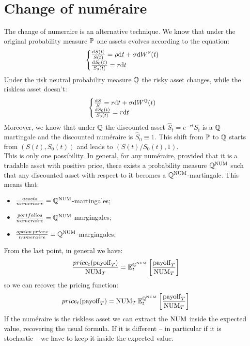 \section{Change of numéraire} %
The change of numeraire is an alternative technique. We know that under the original probability measure $\mathbb{P}$ one assets evolves according to the equation:
\begin{equation}
    \begin{cases}
    \frac{\dd S(t)}{S(t)} = \rho\dd t + \sigma\dd W^{\mathbb{P}}(t) \\
    \frac{\dd S_0(t)}{S_0(t)} = r\dd t
    \end{cases}
\end{equation}
Under the risk neutral probability measure $\mathbb{Q}$ the risky asset changes, while the riskless asset doesn't:
\begin{equation}
    \begin{cases}
    \frac{\dd S}{S} = r\dd t + \sigma\dd W^{\mathbb{Q}}(t) \\
    \frac{\dd S_0(t)}{S_0(t)} = r\dd t
    \end{cases} 
\end{equation}
Moreover, we know that under $\mathbb{Q}$ the discounted asset $\hat{S}_t = e^{-rt}S_t$ is a $\mathbb{Q}$-martingale and the discounted numéraire is $\hat{S}_0 \equiv 1$. This shift from $\mathbb{P}$ to $\mathbb{Q}$ starts from $(S(t),S_0(t))$ and leads to $(S(t)/S_0(t),1)$. \\
This is only one possibility. In general, for any numéraire, provided that it is a tradable asset with positive price, there exists a probability measure $\mathbb{Q}^{\operatorname{NUM}}$ such that any discounted asset with respect to it becomes a $\mathbb{Q}^{\operatorname{NUM}}$-martingale. This means that:
\begin{itemize}
    \item $\frac{assets}{numeraire}=\mathbb{Q}^{\operatorname{NUM}}$-martingales;
    \item $\frac{portfolios}{numeraire}=\mathbb{Q}^{\operatorname{NUM}}$-margingales;
    \item $\frac{option\,prices}{numeraire}=\mathbb{Q}^{\operatorname{NUM}}$-margingales;
\end{itemize}
From the last point, in general we have:
\begin{equation}
    \frac{price_t(\operatorname{payoff}_T)}{\operatorname{NUM}_T} = \mathbb{E}_t^{\mathbb{Q}^{\operatorname{NUM}}} \left[\frac{\operatorname{payoff}_T}{\operatorname{NUM}_T}\right]
\end{equation}
so we can recover the pricing function:
\begin{equation}
    price_t(\operatorname{payoff}_T) = \operatorname{NUM}_T\mathbb{E}_t^{\mathbb{Q}^{\operatorname{NUM}}} \left[\frac{\operatorname{payoff}_T}{\operatorname{NUM}_T}\right]
\end{equation}
If the numéraire is the riskless asset we can extract the $\operatorname{NUM}$ inside the expected value, recovering the usual formula. If it is different -- in particular if it is stochastic -- we have to keep it inside the expected value.

